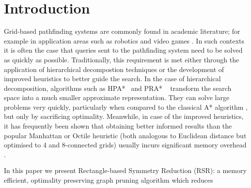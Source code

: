\section{Introduction}
\label{sec:introduction}

Grid-based pathfinding systems are commonly found in academic literature; for
example in application areas such as robotics \cite{choset05} and video games
\cite{botea04,sturtevant05,bjornsson06}.  
In such contexts it is often the case that queries sent to the pathfinding
system need to be solved as quickly as possible.  Traditionally, this
requirement is met either through the application of hierarchical decompostion
techniques or the development of improved heuristics to better guide the search.
In the case of hierarchical decomposition, algorithms such as
HPA*~\cite{botea04} and PRA* ~\cite{sturtevant05} transform the search space
into a much smaller approximate representation. They can solve large problems
very quickly, particularly when compared to the classical A* algorithm
\cite{hart68}, but only by sacrificing optimality.  Meanwhile, in case of the
improved heuristics, it has frequently been shown that obtaining better informed
results than the popular Manhattan or Octile heuristic (both analogous to
Euclidean distance but optimised to 4 and 8-connected grids) usually incurs
significant memory overhead \cite{sturtevant09,goldberg05,Cazenave:06}.
%
\par
In this paper we present Rectangle-based Symmetry Reduction (RSR): a
memory efficient, optimality preserving graph pruning algorithm which reduces
